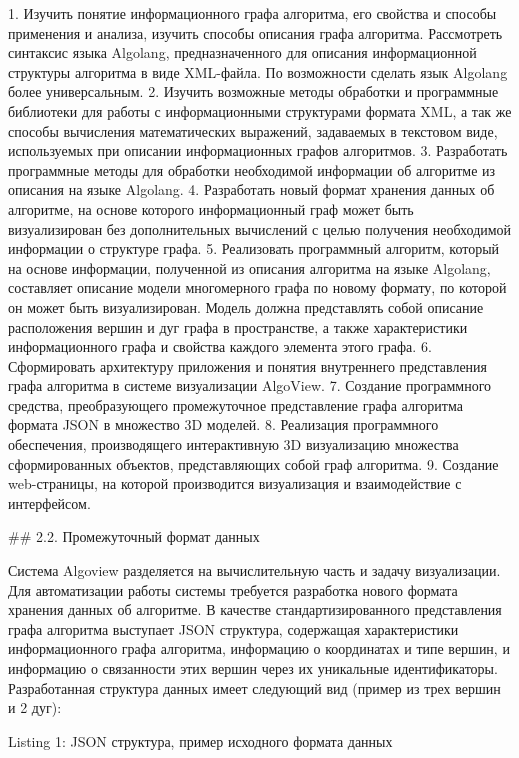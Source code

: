 1. Изучить понятие информационного графа алгоритма, его свойства и способы применения и анализа, изучить способы описания графа алгоритма. Рассмотреть синтаксис языка Algolang, предназначенного для описания информационной структуры алгоритма в виде XML-файла. По возможности сделать язык Algolang более универсальным.
2. Изучить возможные методы обработки и программные библиотеки для работы с информационными структурами формата XML, а так же способы вычисления математических выражений, задаваемых в текстовом виде, используемых при описании информационных графов алгоритмов.
3. Разработать программные методы для обработки необходимой информации об алгоритме из описания на языке Algolang.
4. Разработать новый формат хранения данных об алгоритме, на основе которого информационный граф может быть визуализирован без дополнительных вычислений с целью получения необходимой информации о структуре графа.
5. Реализовать программный алгоритм, который на основе информации, полученной из описания алгоритма на языке Algolang, составляет описание модели многомерного графа по новому формату, по которой он может быть визуализирован. Модель должна представлять собой описание расположения вершин и дуг графа в пространстве, а также характеристики информационного графа и свойства каждого элемента этого графа.
6. Сформировать архитектуру приложения и понятия внутреннего представления графа алгоритма в системе визуализации AlgoView.
7. Создание программного средства, преобразующего промежуточное представление графа алгоритма формата JSON в множество 3D моделей.
8. Реализация программного обеспечения, производящего интерактивную 3D визуализацию множества сформированных объектов, представляющих собой граф алгоритма.
9. Создание web-страницы, на которой производится визуализация и взаимодействие с интерфейсом.

## 2.2. Промежуточный формат данных

Система Algoview разделяется на вычислительную часть и задачу визуализации. Для автоматизации работы системы требуется разработка нового формата хранения данных об алгоритме. В качестве стандартизированного представления графа алгоритма выступает JSON структура, содержащая характеристики информационного графа алгоритма, информацию о координатах и типе вершин, и информацию о связанности этих вершин через их уникальные идентификаторы. Разработанная структура данных имеет следующий вид (пример из трех вершин и 2 дуг):



Listing 1: JSON структура, пример исходного формата данных



